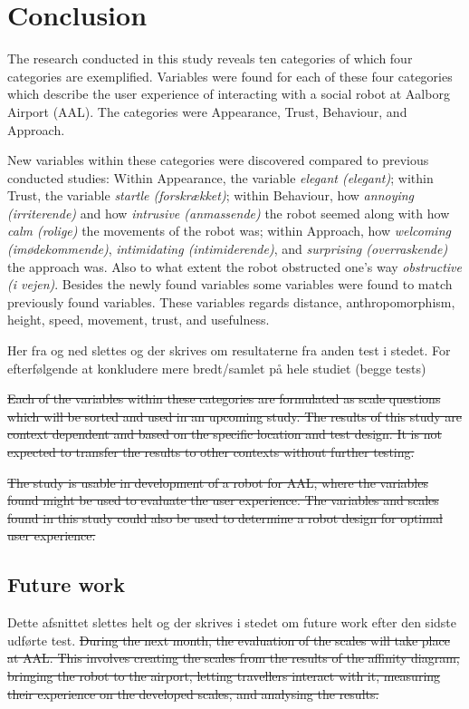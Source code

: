 \section{Conclusion}
\label{Conclusion}
%
The research conducted in this study reveals ten categories of which four categories are exemplified. Variables were found for each of these four categories which describe the user experience of interacting with a social robot at Aalborg Airport (AAL). The categories were Appearance, Trust, Behaviour, and Approach.

New variables within these categories were discovered compared to previous conducted studies: Within Appearance, the variable \textit{elegant (elegant)}; within Trust, the variable \textit{startle (forskrækket)}; within Behaviour, how \textit{annoying (irriterende)} and how \textit{intrusive (anmassende)} the robot seemed along with how \textit{calm (rolige)} the movements of the robot was; within Approach, how \textit{welcoming (imødekommende)}, \textit{intimidating (intimiderende)}, and \textit{surprising (overraskende)} the approach was. Also to what extent the robot obstructed one's way \textit{obstructive (i vejen)}. Besides the newly found variables some variables were found to match previously found variables. These variables regards distance, anthropomorphism, height, speed, movement, trust, and usefulness.

{\color{red} Her fra og ned slettes og der skrives om resultaterne fra anden test i stedet. For efterfølgende at konkludere mere bredt/samlet på hele studiet (begge tests)}

\sout{Each of the variables within these categories are formulated as scale questions which will be sorted and used in an upcoming study. The results of this study are context dependent and based on the specific location and test design. It is not expected to transfer the results to other contexts without further testing. }

\sout{The study is usable in development of a robot for AAL, where the variables found might be used to evaluate the user experience. The variables and scales found in this study could also be used to determine a robot design for optimal user experience.}

\subsection{Future work}
{\color{red} Dette afsnittet slettes helt og der skrives i stedet om future work efter den sidste udførte test. }
\sout{During the next month, the evaluation of the scales will take place at AAL. This involves creating the scales from the results of the affinity diagram, bringing the robot to the airport, letting travellers interact with it, measuring their experience on the developed scales, and analysing the results.}